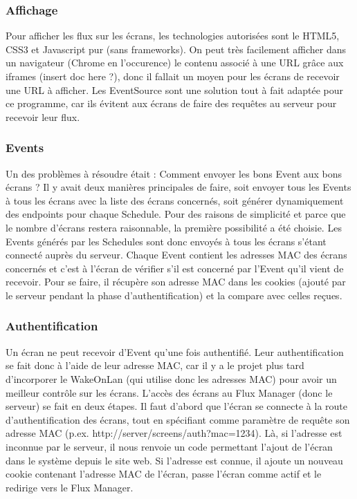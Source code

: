 \documentclass[french]{article}
\begin{document}
\subsubsection{Affichage}
Pour afficher les flux sur les écrans, les technologies autorisées sont le HTML5, CSS3 et Javascript pur (sans frameworks). On peut très facilement afficher dans un navigateur (Chrome en l'occurence) le contenu associé à une URL grâce aux iframes (insert doc here ?), donc il fallait un moyen pour les écrans de recevoir une URL à afficher. Les EventSource sont une solution tout à fait adaptée pour ce programme, car ils évitent aux écrans de faire des requêtes au serveur pour recevoir leur flux.

\subsubsection{Events}
Un des problèmes à résoudre était : Comment envoyer les bons Event aux bons écrans ? Il y avait deux manières principales de faire, soit envoyer tous les Events à tous les écrans avec la liste des écrans concernés, soit générer dynamiquement des endpoints pour chaque Schedule. Pour des raisons de simplicité et parce que le nombre d'écrans restera raisonnable, la première possibilité a été choisie. \newline
Les Events générés par les Schedules sont donc envoyés à tous les écrans s'étant connecté auprès du serveur. Chaque Event contient les adresses MAC des écrans concernés et c'est à l'écran de vérifier s'il est concerné par l'Event qu'il vient de recevoir. Pour se faire, il récupère son adresse MAC dans les cookies (ajouté par le serveur pendant la phase d'authentification) et la compare avec celles reçues. 

\subsubsection{Authentification}
Un écran ne peut recevoir d'Event qu'une fois authentifié. Leur authentification se fait donc à l'aide de leur adresse MAC, car il y a le projet plus tard d'incorporer le WakeOnLan (qui utilise donc les adresses MAC) pour avoir un meilleur contrôle sur les écrans. \newline
L'accès des écrans au Flux Manager (donc le serveur) se fait en deux étapes. Il faut d'abord que l'écran se connecte à la route d'authentification des écrans, tout en spécifiant comme paramètre de requête son adresse MAC (p.ex. http://server/screens/auth?mac=1234). Là, si l'adresse est inconnue par le serveur, il nous renvoie un code permettant l'ajout de l'écran dans le système depuis le site web. Si l'adresse est connue, il ajoute un nouveau cookie contenant l'adresse MAC de l'écran, passe l'écran comme actif et le redirige vers le Flux Manager.
\end{document}
